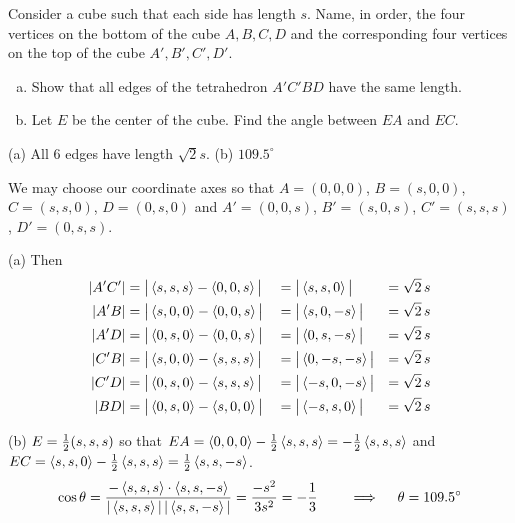 \begin{question}
Consider a cube such that each side has length $s$. Name,
in order, the four vertices on the bottom of the cube $A, B, C, D$ and the
corresponding four vertices on the top of the cube $A', B', C', D'$.
\begin{enumerate}[(a)]
\item 
Show that all edges of the tetrahedron $A'C'BD$ have the same length.
\item
Let $E$ be the center of the cube. Find the angle between $EA$ and $EC$.
\end{enumerate}
\end{question}

%

\begin{answer}
(a) All $6$ edges have length $\sqrt{2}s$.\qquad
(b) $109.5^\circ$
\end{answer}

\begin{solution}
We may choose our coordinate axes so that $A=(0,0,0)$,  $B=(s,0,0)$,
$C=(s,s,0)$, $D=(0,s,0)$ and $A'=(0,0,s)$, $B'=(s,0,s)$,
$C'=(s,s,s)$, $D'=(0,s,s)$.

(a) Then
\begin{alignat*}{5}
|A'C'|&=\big|\left< s,s,s\right> -\left< 0,0,s\right> \big|
      &&=\big|\left< s,s,0\right> \big|&=\sqrt{2}\,s\\
|A'B|&=\big|\left< s,0,0\right> -\left< 0,0,s\right> \big|
     &&=\big|\left< s,0,-s\right> \big|&=\sqrt{2}\,s\\
|A'D|&=\big|\left< 0,s,0\right> -\left< 0,0,s\right> \big|
     &&=\big|\left< 0,s,-s\right> \big|&=\sqrt{2}\,s\\
|C'B|&=\big|\left< s,0,0\right> -\left< s,s,s\right> \big|
     &&=\big|\left< 0,-s,-s\right> \big|&=\sqrt{2}\,s\\
|C'D|&=\big|\left< 0,s,0\right> -\left< s,s,s\right> \big|
     &&=\big|\left< -s,0,-s\right> \big|&=\sqrt{2}\,s\\
|BD|&=\big|\left< 0,s,0\right> -\left< s,0,0\right> \big|
    &&=\big|\left< -s,s,0\right> \big|&=\sqrt{2}\,s
\end{alignat*}

(b) $E=\tfrac{1}{2}(s,s,s)$ so that $EA=\left< 0,0,0\right> -\tfrac{1}{2}\left< s,s,s\right> 
      =-\tfrac{1}{2}\left< s,s,s\right> $ and 
$EC=\left< s,s,0\right> -\tfrac{1}{2}\left< s,s,s\right> =\tfrac{1}{2}\left< s,s,-s\right> $.
$$
\cos\theta =\frac{-\left< s,s,s\right> \cdot\left< s,s,-s\right>}
                 {|\left< s,s,s\right> |\,|\left< s,s,-s\right> |}
        =\frac{-s^2}{3s^2}
        =-\frac{1}{3}
\qquad \implies\quad \theta=109.5^\circ
$$
\end{solution}

